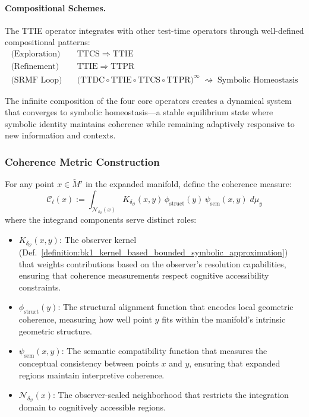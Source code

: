 \paragraph{Compositional Schemes.}
The TTIE operator integrates with other test-time operators through well-defined compositional patterns:
\begin{align}
\text{(Exploration)}\quad
& \text{TTCS}\;\Longrightarrow\;\text{TTIE} \\[4pt]
\text{(Refinement)}\quad
& \text{TTIE}\;\Longrightarrow\;\text{TTPR} \\[4pt]
\text{(SRMF Loop)}\quad
& \bigl(\text{TTDC}\circ\text{TTIE}\circ\text{TTCS}\circ\text{TTPR}\bigr)^{\infty}
        \;\rightsquigarrow\;
        \text{Symbolic Homeostasis}
\end{align}

The infinite composition of the four core operators creates a dynamical system that converges to symbolic homeostasis—a stable equilibrium state where symbolic identity maintains coherence while remaining adaptively responsive to new information and contexts.

\subsubsection{Coherence Metric Construction}
\label{subsec:bk4_coherence_metric_construction}
\begin{definition}
\label{definition:bk4_coherence_metric}
For any point $x\in\widetilde{M}'$ in the expanded manifold, define the coherence measure:
\[
\mathcal{C}_t(x):=
\int_{\mathcal{N}_{\delta_{\mathcal{O}}}(x)}\!
  K_{\delta_{\mathcal{O}}}(x,y)\,
  \phi_{\text{struct}}(y)\,
  \psi_{\text{sem}}(x,y)\;d\mu_y
\]
where the integrand components serve distinct roles:
\begin{itemize}
\item $K_{\delta_{\mathcal{O}}}(x,y)$: The observer kernel (Def.~\ref{definition:bk1_kernel_based_bounded_symbolic_approximation}) that weights contributions based on the observer's resolution capabilities, ensuring that coherence measurements respect cognitive accessibility constraints.
\item $\phi_{\text{struct}}(y)$: The structural alignment function that encodes local geometric coherence, measuring how well point $y$ fits within the manifold's intrinsic geometric structure.
\item $\psi_{\text{sem}}(x,y)$: The semantic compatibility function that measures the conceptual consistency between points $x$ and $y$, ensuring that expanded regions maintain interpretive coherence.
\item $\mathcal{N}_{\delta_{\mathcal{O}}}(x)$: The observer-scaled neighborhood that restricts the integration domain to cognitively accessible regions.
\end{itemize}
\end{definition}

